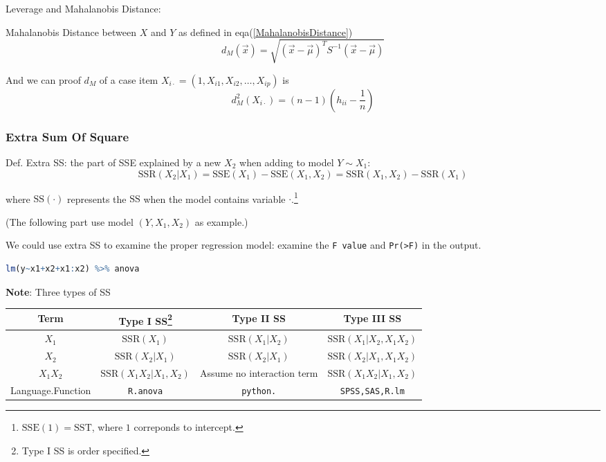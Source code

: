 Leverage and Mahalanobis Distance:
    
Mahalanobis Distance between $ X $ and $ Y $ as defined in eqa(\ref{MahalanobisDistance})
\begin{equation}
     d_M(\vec{x})=\sqrt{(\vec{x}-\vec{\mu})^TS ^{-1}(\vec{x}-\vec{\mu})} 
\end{equation}

And we can proof $ d_M $ of a case item $ X_{ i\cdot}=(1,X_{i1},X_{i2},\ldots,X_{ip}) $ is
\begin{equation}
    d_{M}^2(X_{i\cdot})=(n-1)(h_{ii}-\dfrac{1}{n}) 
\end{equation}


\subsubsection{Extra Sum Of Square}
    Def. Extra SS: the part of SSE explained by a new $ X_2 $ when adding to model $ Y\sim X_1 $:
    \begin{equation}
        \mathrm{SSR}(X_2|X_1)=\mathrm{SSE}(X_1)-\mathrm{SSE}(X_1,X_2)=\mathrm{SSR}(X_1,X_2)-\mathrm{SSR}(X_1)  
    \end{equation}

    where $ \mathrm{SS}(\cdot)  $ represents the $ \mathrm{SS} $ when the model contains variable $ \cdot $.\footnote{$ \mathrm{SSE}(1)=\mathrm{SST} $, where $ 1 $ correponds to intercept.}
    
    
    (The following part use model $ (Y,X_1,X_2) $ as example.)


    We could use extra SS to examine the proper regression model: examine the \lstinline|F value| and \lstinline|Pr(>F)| in the output.
\begin{rcode}
\begin{lstlisting}[language=R]
lm(y~x1+x2+x1:x2) %>% anova
\end{lstlisting}
\end{rcode}

    \textbf{Note}: Three types of SS 
\begin{table}[H]
    \centering
    \renewcommand\arraystretch{1.15}
    \begin{tabular}{c|ccc}
        \hline
        Term&Type I SS\footnote{Type I SS is order specified.}&Type II SS&Type III SS\\\hline
        $ X_1 $&$ \mathrm{SSR}(X_1) $&$ \mathrm{SSR}(X_1|X_2)  $&$ \mathrm{SSR}(X_1|X_2,X_1X_2)  $\\
        $ X_2 $&$ \mathrm{SSR}(X_2|X_1) $&$ \mathrm{SSR}(X_2|X_1)  $&$ \mathrm{SSR}(X_2|X_1,X_1X_2)  $\\
        $ X_1X_2 $&$ \mathrm{SSR}(X_1X_2|X_1,X_2) $&Assume no interaction term &$ \mathrm{SSR}(X_1X_2|X_1,X_2)  $\\\hline
        Language.Function&\lstinline|R.anova|&\lstinline|python.|&\lstinline|SPSS,SAS,R.lm|\\
        \hline
    \end{tabular}
\end{table}

